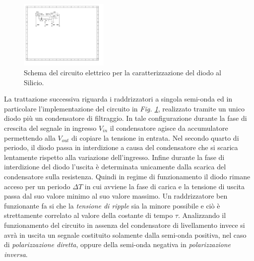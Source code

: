 \documentclass[journal]{IEEEtran}
\begin{document}
\begin{figure}[H]%
\begin{center}
\includegraphics[width=0.38\textwidth]{sch-simulations/output/Diode-rectifier.pdf}
\caption{Schema del circuito elettrico per la caratterizzazione del diodo al Silicio.}
\label{fig:diode-rectifier}
\end{center}
\end{figure}
La trattazione successiva riguarda i raddrizzatori a singola semi-onda ed in particolare l'implementazione del circuito in \textit{Fig. \ref{fig:diode-rectifier}}, realizzato tramite un unico diodo più un condensatore di filtraggio. In tale configurazione durante la fase di crescita del segnale in ingresso $V_{in}$ il condensatore agisce da accumulatore permettendo alla $V_{out}$ di copiare la tensione in entrata. Nel secondo quarto di periodo, il diodo passa in interdizione a causa del condensatore che si scarica lentamente rispetto alla variazione dell'ingresso. Infine durante la fase di interdizione del diodo l'uscita è determinata unicamente dalla scarica del condensatore sulla resistenza.
Quindi in regime di funzionamento il diodo rimane acceso per un periodo $\Delta T$ in cui avviene la fase di carica e la tensione di uscita passa dal suo valore minimo al suo valore massimo. Un raddrizzatore ben funzionante fa si che la \textit{tensione di ripple} sia la minore possibile e ciò è strettamente correlato al valore della costante di tempo $\tau$.
Analizzando il funzionamento del circuito in assenza del condensatore di livellamento invece si avrà in uscita un segnale costituito solamente dalla semi-onda positiva, nel caso di \textit{polarizzazione diretta}, oppure della semi-onda negativa in \textit{polarizzazione inversa}.
\end{document}

